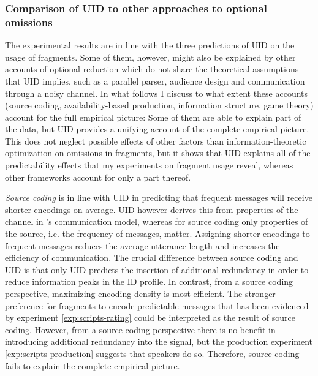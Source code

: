 \subsubsection{Comparison of UID to other approaches to optional omissions}
The experimental results are in line with the three predictions of UID on the usage of fragments. Some of them, however, might also be explained by other accounts of optional reduction which do not share the theoretical assumptions that UID implies, such as a parallel parser, audience design and communication through a noisy channel. In what follows I discuss to what extent these accounts (source coding, availability-based production, information structure, game theory) account for the full empirical picture: Some of them are able to explain part of the data, but UID provides a unifying account of the complete empirical picture. This does not neglect possible effects of other factors than information-theoretic optimization on omissions in fragments, but it shows that UID explains all of the predictability effects that my experiments on fragment usage reveal, whereas other frameworks account for only a part thereof.

\textit{Source coding} is in line with UID in predicting that frequent messages will receive shorter encodings on average. UID however derives this from properties of the channel in \citeauthor{shannon1948}'s communication model, whereas for source coding only properties of the source, i.e. the frequency of messages, matter. Assigning shorter encodings  to frequent messages reduces the average utterance length and increases the efficiency of communication. The crucial difference between source coding and UID is that only UID predicts the insertion of additional redundancy in order to reduce information peaks in the ID profile. In contrast, from a source coding perspective, maximizing encoding density is most efficient. The stronger preference for fragments to encode predictable messages that has been evidenced by experiment \ref{exp:scripts-rating} could be interpreted as the result of source coding.  However, from a source coding perspective there is no benefit in introducing additional redundancy into the signal, but the production experiment \ref{exp:scripts-production} suggests that speakers do so. Therefore, source coding fails to explain the complete empirical picture. 


